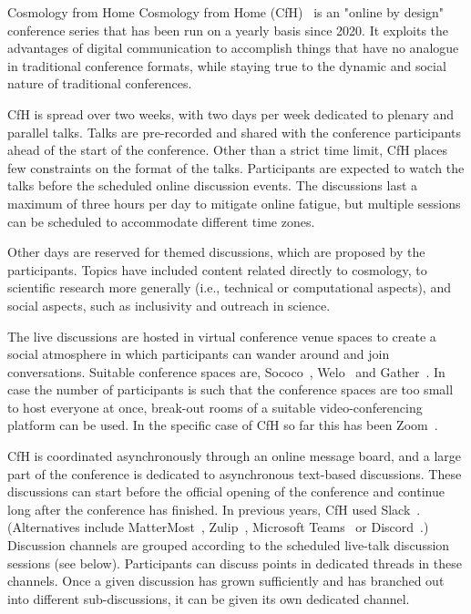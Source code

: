 \documentclass[../SustainableHEP.tex]{subfiles}
\begin{document}

\begin{casestudy}{Cosmology from Home}%
Cosmology from Home (CfH)~\cite{CfHwebsite} is an "online by design" conference series that has been run on a yearly basis since 2020. It exploits the advantages of digital communication to accomplish things that have no analogue in traditional conference formats, while staying true to the dynamic and social nature of traditional conferences.

CfH is spread over two weeks, with two days per week dedicated to plenary and parallel talks. Talks are pre-recorded and shared with the conference participants ahead of the start of the conference. Other than a strict time limit, CfH places few constraints on the format of the talks. Participants are expected to watch the talks before the scheduled online discussion events. The discussions last a maximum of three hours per day to mitigate online fatigue, but multiple sessions can be scheduled to accommodate different time zones.

Other days are reserved for themed discussions, which are proposed by the participants.  Topics have included content related directly to cosmology, to scientific research more generally (i.e., technical or computational aspects), and social aspects, such as inclusivity and outreach in science.

The live discussions are hosted in virtual conference venue spaces to create a social atmosphere in which participants can wander around and join conversations. Suitable conference spaces are, \eg Sococo~\cite{Sococo}, Welo~\cite{Welo} and Gather~\cite{Gather}. In case the number of participants is such that the conference spaces are too small to host everyone at once, break-out rooms of a suitable video-conferencing platform can be used. In the specific case of CfH so far this has been Zoom~\cite{Zoom}.

CfH is coordinated asynchronously through an online message board, and a large part of the conference is dedicated to asynchronous text-based discussions. These discussions can start before the official opening of the conference and continue long after the conference has finished. In previous years, CfH used Slack~\cite{Slack}. (Alternatives include MatterMost~\cite{MatterMost}, Zulip~\cite{Zulip}, Microsoft Teams~\cite{Teams} or Discord~\cite{Discord}.) Discussion channels are grouped according to the scheduled live-talk discussion sessions (see below). Participants can discuss points in dedicated threads in these channels. Once a given discussion has grown sufficiently and has branched out into different sub-discussions, it can be given its own dedicated channel.


\end{casestudy}
\end{document}
